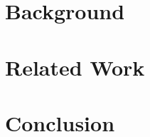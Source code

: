 \documentclass[conference]{IEEEtran}
\begin{document}

\section{Background}\label{sec:background}



\section{Related Work}\label{sec:related_work}
\section{Conclusion}\label{sec:conclusion}






\end{document}
